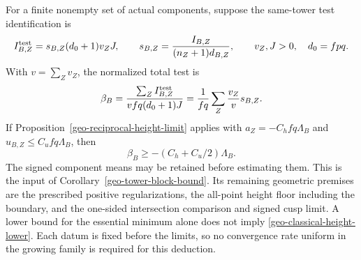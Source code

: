 For a finite nonempty set of actual components, suppose the same-tower test
identification is
\[
 I^{\rm test}_{B,Z}
 =s_{B,Z}(d_0+1)v_ZJ,\qquad
 s_{B,Z}=\frac{I_{B,Z}}{(n_Z+1)d_{B,Z}},\qquad
 v_Z,J>0,\quad d_0=fpq.
\]
With $v=\sum_Zv_Z$, the normalized total test is
\[
 \beta_B=\frac{\sum_ZI^{\rm test}_{B,Z}}{vfq(d_0+1)J}
         =\frac1{fq}\sum_Z\frac{v_Z}{v}s_{B,Z}.
\]
If Proposition~\ref{geo-reciprocal-height-limit} applies with
$a_Z=-C_hfq\Lambda_B$ and $u_{B,Z}\le C_ufq\Lambda_B$, then
\[
                   \beta_B\ge-(C_h+C_u/2)\Lambda_B.
\]
The signed component means may be retained before estimating them.
This is the input of Corollary~\ref{geo-tower-block-bound}. Its
remaining geometric premises are the prescribed positive
regularizations, the all-point height floor including the boundary,
and the one-sided intersection comparison and signed cusp limit.
A lower bound for the essential minimum alone does not imply
\eqref{geo-classical-height-lower}. Each datum is fixed before the
limits, so no convergence rate uniform in the growing family is
required for this deduction.
